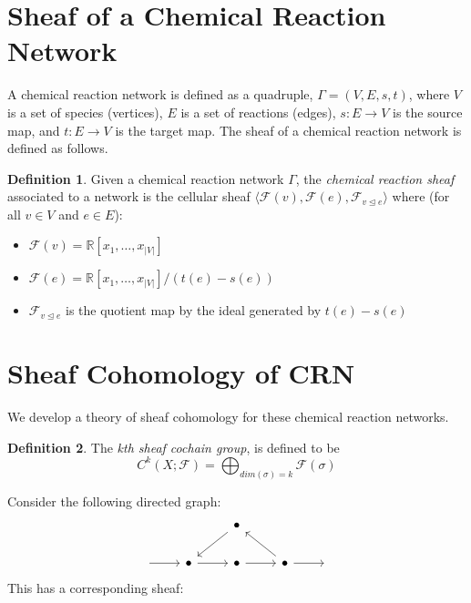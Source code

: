 \documentclass[12pt]{article}
\theoremstyle{definition}
\newtheorem{definition}{Definition}
\newcommand{\F}{\mathcal{F}}
\newcommand{\<}{\langle}
\renewcommand{\>}{\rangle}
\begin{document}
\section{Sheaf of a Chemical Reaction Network}

A chemical reaction network is defined as a quadruple, $\Gamma = (V, E, s, t)$, where $V$ is a set of
species (vertices), $E$ is a set of reactions (edges), $s: E \to V$ is the source map, and
$t: E \to V$ is the target map. The sheaf of a chemical reaction network is defined as follows.

\begin{definition} Given a chemical reaction network $\Gamma$, the \textit{chemical reaction sheaf} associated to a 
network is the cellular sheaf $ \< \F(v) , \F(e), \F_{v \trianglelefteq e} \>$ where
(for all $v \in V $ and $e \in E$):

\begin{itemize}
  \item $\F(v) = \mathbb{R}[x_1, \ldots, x_{|V|}]$
  \item $\F(e) = \mathbb{R}[x_1, \ldots, x_{|V|}] / (t(e) - s(e))$
  \item $\F_{v \trianglelefteq e}$ is the quotient map by the ideal generated
    by $t(e) - s(e)$
\end{itemize}
\end{definition}

\section{Sheaf Cohomology of CRN}

We develop a theory of sheaf cohomology for these chemical reaction networks. 
\begin{definition}
  The \textit{kth sheaf cochain group}, is defined to be
  \begin{equation*}
    C^k(X ; \F) = \bigoplus_{dim(\sigma) = k} \F(\sigma)
  \end{equation*}
\end{definition}

Consider the following directed graph:
\[\begin{tikzcd}
	&& \bullet \\
	{} & \bullet & \bullet & \bullet & {}
	\arrow[from=1-3, to=2-2]
	\arrow[from=2-1, to=2-2]
	\arrow[from=2-2, to=2-3]
	\arrow[from=2-3, to=2-4]
	\arrow[from=2-4, to=1-3]
	\arrow[from=2-4, to=2-5]
\end{tikzcd}\]
This has a corresponding sheaf:
\end{document}
